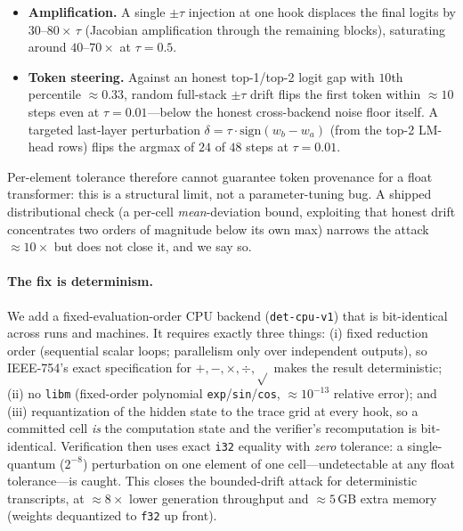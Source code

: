 \documentclass[11pt]{article}
\newcommand{\code}[1]{\texttt{#1}}
\begin{document}
\begin{itemize}[leftmargin=1.2em,itemsep=2pt]
\item \textbf{Amplification.} A single $\pm\tau$ injection at one hook displaces
the final logits by $30$--$80\times\,\tau$ (Jacobian amplification through the
remaining blocks), saturating around $40$--$70\times$ at $\tau = 0.5$.
\item \textbf{Token steering.} Against an honest top-1/top-2 logit gap with
$10$th percentile ${\approx}0.33$, random full-stack $\pm\tau$ drift flips the
first token within ${\approx}10$ steps even at $\tau = 0.01$---below the honest
cross-backend noise floor itself. A targeted last-layer perturbation
$\delta = \tau\cdot\mathrm{sign}(w_b - w_a)$ (from the top-2 LM-head rows) flips
the argmax of $24$ of $48$ steps at $\tau = 0.01$.
\end{itemize}

Per-element tolerance therefore cannot guarantee token provenance for a float
transformer: this is a structural limit, not a parameter-tuning bug. A shipped
distributional check (a per-cell \emph{mean}-deviation bound, exploiting that
honest drift concentrates two orders of magnitude below its own max) narrows the
attack ${\approx}10\times$ but does not close it, and we say so.

\paragraph{The fix is determinism.} We add a fixed-evaluation-order CPU backend
(\code{det-cpu-v1}) that is bit-identical across runs and machines. It requires
exactly three things: (i) fixed reduction order (sequential scalar loops;
parallelism only over independent outputs), so IEEE-754's exact specification for
$+,-,\times,\div,\sqrt{}$ makes the result deterministic; (ii) no \code{libm}
(fixed-order polynomial \code{exp}/\code{sin}/\code{cos}, ${\approx}10^{-13}$
relative error); and (iii) requantization of the hidden state to the trace grid
at every hook, so a committed cell \emph{is} the computation state and the
verifier's recomputation is bit-identical. Verification then uses exact
\code{i32} equality with \emph{zero} tolerance: a single-quantum ($2^{-8}$)
perturbation on one element of one cell---undetectable at any float
tolerance---is caught. This closes the bounded-drift attack for deterministic
transcripts, at ${\approx}8\times$ lower generation throughput and
${\approx}5$\,GB extra memory (weights dequantized to \code{f32} up front).
\end{document}
